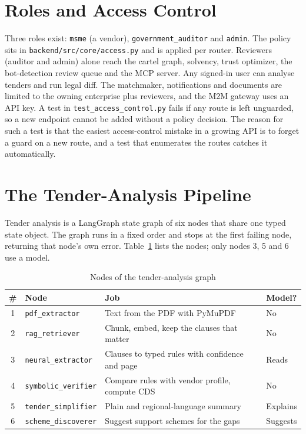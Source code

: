 \section{Roles and Access Control}
Three roles exist: \texttt{msme} (a vendor), \texttt{government\_auditor} and \texttt{admin}. The policy sits in \texttt{backend/src/core/access.py} and is applied per router. Reviewers (auditor and admin) alone reach the cartel graph, solvency, trust optimizer, the bot-detection review queue and the MCP server. Any signed-in user can analyse tenders and run legal diff. The matchmaker, notifications and documents are limited to the owning enterprise plus reviewers, and the M2M gateway uses an API key. A test in \texttt{test\_access\_control.py} fails if any route is left unguarded, so a new endpoint cannot be added without a policy decision. The reason for such a test is that the easiest access-control mistake in a growing API is to forget a guard on a new route, and a test that enumerates the routes catches it automatically.

\section{The Tender-Analysis Pipeline}
Tender analysis is a LangGraph state graph of six nodes that share one typed state object. The graph runs in a fixed order and stops at the first failing node, returning that node's own error. Table~\ref{tab:nodes} lists the nodes; only nodes 3, 5 and 6 use a model.

\begin{table}[htbp]
\centering
\caption{Nodes of the tender-analysis graph}
\label{tab:nodes}
\small
\renewcommand{\arraystretch}{1.1}
\begin{tabularx}{\textwidth}{@{}c>{\raggedright\arraybackslash}p{3.3cm}>{\raggedright\arraybackslash}X>{\centering\arraybackslash}p{1.3cm}@{}}
\toprule
\textbf{\#} & \textbf{Node} & \textbf{Job} & \textbf{Model?} \\
\midrule
1 & \texttt{pdf\_extractor} & Text from the PDF with PyMuPDF & No \\
2 & \texttt{rag\_retriever} & Chunk, embed, keep the clauses that matter & No \\
3 & \texttt{neural\_extractor} & Clauses to typed rules with confidence and page & Reads \\
4 & \texttt{symbolic\_verifier} & Compare rules with vendor profile, compute CDS & No \\
5 & \texttt{tender\_simplifier} & Plain and regional-language summary & Explains \\
6 & \texttt{scheme\_discoverer} & Suggest support schemes for the gaps & Suggests \\
\bottomrule
\end{tabularx}
\end{table}

